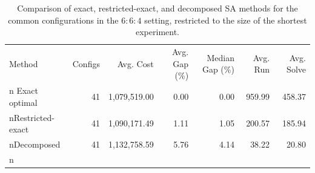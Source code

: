 \begin{table}[t]
\centering
\caption{Comparison of exact, restricted-exact, and decomposed SA methods for the common configurations in the $6{:}6{:}4$ setting, restricted to the size of the shortest experiment.}\n\label{tab:sa_s664_threeway}\n\begin{tabular}{lrrrrrr}\n\hline
Method & Configs & Avg. Cost & Avg. Gap (\%) & Median Gap (\%) & Avg. Run & Avg. Solve \\n\hline
Exact optimal & 41 & 1,079,519.00 & 0.00 & 0.00 & 959.99 & 458.37 \\nRestricted-exact & 41 & 1,090,171.49 & 1.11 & 1.05 & 200.57 & 185.94 \\nDecomposed & 41 & 1,132,758.59 & 5.76 & 4.14 & 38.22 & 20.80 \\n\hline
\end{tabular}\n\end{table}\n